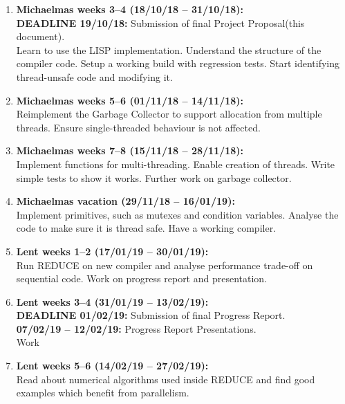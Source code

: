 \documentclass[12pt,a4paper,twoside]{article}
\begin{document}
	\begin{enumerate}
		
		\item \textbf{Michaelmas weeks 3--4 (18/10/18 -- 31/10/18):} \\ 
		\textbf{DEADLINE 19/10/18:} Submission of final Project Proposal(this document). \\
		Learn to use the LISP implementation. Understand the structure of the compiler code.
		Setup a working build with regression tests. Start identifying thread-unsafe code and
		modifying it.
		
		\item \textbf{Michaelmas weeks 5--6 (01/11/18 -- 14/11/18):} \\
		Reimplement the Garbage Collector to support allocation from multiple threads.
		Ensure single-threaded behaviour is not affected.
		
		\item \textbf{Michaelmas weeks 7--8 (15/11/18 -- 28/11/18):} \\
		Implement functions for multi-threading. Enable creation of threads. Write simple
		tests to show it works. Further work on garbage collector.
		
		\item \textbf{Michaelmas vacation (29/11/18 -- 16/01/19):} \\
		Implement primitives, such as mutexes and condition variables. Analyse the code to
		make sure it is thread safe. Have a working compiler.
		
		\item \textbf{Lent weeks 1--2 (17/01/19 -- 30/01/19):} \\
		Run REDUCE on new compiler and analyse performance trade-off on sequential code.
		Work on progress report and presentation.
		
		\item \textbf{Lent weeks 3--4 (31/01/19 -- 13/02/19):} \\
		\textbf{DEADLINE 01/02/19:} Submission of final Progress Report. \\
		\textbf{07/02/19 -- 12/02/19:} Progress Report Presentations. \\
		Work 
		
		\item \textbf{Lent weeks 5--6 (14/02/19 -- 27/02/19):} \\
		Read about numerical algorithms used inside REDUCE and find
		good examples which benefit from parallelism.
		

\end{enumerate}
\end{document}

